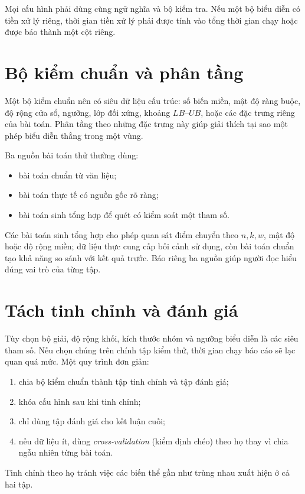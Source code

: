 Mọi cấu hình phải dùng cùng ngữ nghĩa và bộ kiểm tra. Nếu một bộ biểu diễn có tiền
xử lý riêng, thời gian tiền xử lý phải được tính vào tổng thời gian chạy hoặc
được báo thành một cột riêng.

\section{Bộ kiểm chuẩn và phân tầng}

Một bộ kiểm chuẩn nên có siêu dữ liệu cấu trúc: số biến miền, mật độ ràng buộc,
độ rộng cửa sổ, ngưỡng, lớp đối xứng, khoảng \(LB\)--\(UB\), hoặc các đặc trưng
riêng của bài toán. Phân tầng theo những đặc trưng này giúp giải thích tại sao
một phép biểu diễn thắng trong một vùng.

Ba nguồn bài toán thử thường dùng:
\begin{itemize}
  \item bài toán chuẩn từ văn liệu;
  \item bài toán thực tế có nguồn gốc rõ ràng;
  \item bài toán sinh tổng hợp để quét có kiểm soát một tham số.
\end{itemize}

Các bài toán sinh tổng hợp cho phép quan sát điểm chuyển theo \(n,k,w\), mật độ
hoặc độ rộng miền; dữ liệu thực cung cấp bối cảnh sử dụng, còn bài toán chuẩn
tạo khả năng so sánh với kết quả trước. Báo riêng ba nguồn giúp người đọc hiểu
đúng vai trò của từng tập.

\section{Tách tinh chỉnh và đánh giá}

Tùy chọn bộ giải, độ rộng khối, kích thước nhóm và ngưỡng biểu diễn là các siêu
tham số. Nếu chọn chúng trên chính tập kiểm thử, thời gian chạy báo cáo sẽ lạc
quan quá mức. Một quy trình đơn giản:
\begin{enumerate}
  \item chia bộ kiểm chuẩn thành tập tinh chỉnh và tập đánh giá;
  \item khóa cấu hình sau khi tinh chỉnh;
  \item chỉ dùng tập đánh giá cho kết luận cuối;
  \item nếu dữ liệu ít, dùng \emph{cross-validation} (kiểm định chéo) theo họ
        thay vì chia ngẫu nhiên từng bài toán.
\end{enumerate}

Tinh chỉnh theo họ tránh việc các biến thể gần như trùng nhau xuất hiện ở cả
hai tập.

